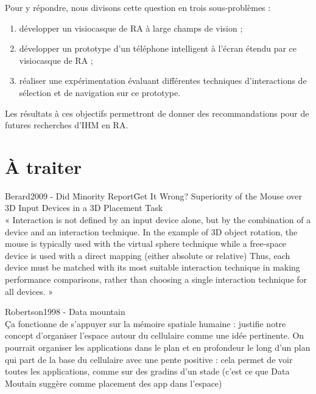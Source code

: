 Pour y répondre, nous divisons cette question en trois sous-problèmes :
\begin{enumerate}
  \item développer un visiocasque de RA à large champs de vision ;
  \item développer un prototype d'un téléphone intelligent à l'écran étendu par ce visiocasque de RA ;
  \item réaliser une expérimentation évaluant différentes techniques d'interactions de sélection et de navigation sur ce prototype.
\end{enumerate}

Les résultats à ces objectifs permettront de donner des recommandations pour de futures recherches d'IHM en RA.


\section{À traiter}
Berard2009 - Did \"Minority Report\" Get It Wrong? Superiority of the Mouse over 3D Input Devices in a 3D Placement Task\\
« Interaction is not defined by an input device alone, but by the combination of a device and an interaction technique. In the example of 3D object rotation, the mouse is typically used with the virtual sphere technique while a free-space device is used with a direct mapping (either absolute or relative) Thus, each device must be matched with its most suitable interaction technique in making performance comparisons, rather than choosing a single interaction technique for all devices. »

Robertson1998 - Data mountain\\
Ça fonctionne de s'appuyer sur la mémoire spatiale humaine : justifie notre concept d'organiser l'espace autour du cellulaire comme une idée pertinente. On pourrait organiser les applications dans le plan et en profondeur le long d'un plan qui part de la base du cellulaire avec une pente positive : cela permet de voir toutes les applications, comme sur des gradins d'un stade (c'est ce que Data Moutain suggère comme placement des app dans l'espace)

